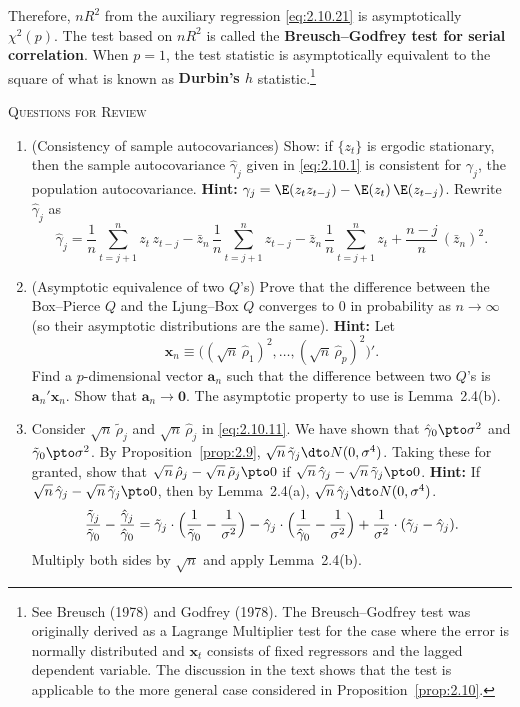 Therefore, $nR^2$ from the auxiliary regression \eqref{eq:2.10.21} is asymptotically
$\chi^2(p)$. The test based on $nR^2$ is called the
\textbf{Breusch--Godfrey test for serial correlation}. When $p = 1$, the test statistic is
asymptotically equivalent to the square of what is known as \textbf{Durbin's $h$}
statistic.\footnote{See Breusch (1978) and Godfrey (1978). The Breusch--Godfrey test
was originally derived as a Lagrange Multiplier test for the case where the error is
normally distributed and $\mathbf{x}_t$ consists of fixed regressors and the lagged dependent
variable. The discussion in the text shows that the test is applicable to the more general
case considered in Proposition~\ref{prop:2.10}.}

\bigskip
\noindent\textsc{Questions for Review}
\begin{enumerate}
\item (Consistency of sample autocovariances)\quad
Show: if $\{z_t\}$ is ergodic stationary,
then the sample autocovariance $\hat{\gamma}_j$ given in \eqref{eq:2.10.1} is consistent for
$\gamma_j$, the population autocovariance.
\textbf{Hint:} $\gamma_j = \E(z_t z_{t-j}) - \E(z_t)\,\E(z_{t-j})$. Rewrite $\hat{\gamma}_j$ as
\[
\hat{\gamma}_j = \frac{1}{n}\sum_{t=j+1}^{n} z_t\,z_{t-j}
- \bar{z}_n\,\frac{1}{n}\sum_{t=j+1}^{n}z_{t-j}
- \bar{z}_n\,\frac{1}{n}\sum_{t=j+1}^{n}z_t
+ \frac{n-j}{n}\,(\bar{z}_n)^2.
\]

\item (Asymptotic equivalence of two $Q$'s)\quad
Prove that the difference between the
Box--Pierce $Q$ and the Ljung--Box $Q$ converges to 0 in probability as $n \to \infty$
(so their asymptotic distributions are the same). \textbf{Hint:} Let
\[
\mathbf{x}_n \equiv \bigl((\sqrt{n}\,\hat{\rho}_1)^2, \ldots,
(\sqrt{n}\,\hat{\rho}_p)^2\bigr)'.
\]
Find a $p$-dimensional vector $\mathbf{a}_n$ such that the difference between two $Q$'s is
$\mathbf{a}_n'\mathbf{x}_n$. Show that $\mathbf{a}_n \to \mathbf{0}$. The asymptotic property to use is Lemma~2.4(b).

\item Consider $\sqrt{n}\,\tilde{\rho}_j$ and $\sqrt{n}\,\hat{\rho}_j$ in \eqref{eq:2.10.11}.
We have shown that $\hat{\gamma}_0 \pto \sigma^2$ and
$\tilde{\gamma}_0 \pto \sigma^2$. By Proposition~\ref{prop:2.9},
$\sqrt{n}\,\tilde{\gamma}_j \dto N(0, \sigma^4)$. Taking these for granted,
show that $\sqrt{n}\,\hat{\rho}_j - \sqrt{n}\,\tilde{\rho}_j \pto 0$
if $\sqrt{n}\,\hat{\gamma}_j - \sqrt{n}\,\tilde{\gamma}_j \pto 0$.
\textbf{Hint:} If $\sqrt{n}\,\hat{\gamma}_j - \sqrt{n}\,\tilde{\gamma}_j \pto 0$,
then by Lemma~2.4(a), $\sqrt{n}\,\hat{\gamma}_j \dto N(0, \sigma^4)$.
\[
\frac{\tilde{\gamma}_j}{\tilde{\gamma}_0}
- \frac{\hat{\gamma}_j}{\hat{\gamma}_0}
= \tilde{\gamma}_j \cdot \Bigl(\frac{1}{\tilde{\gamma}_0}
- \frac{1}{\sigma^2}\Bigr)
- \hat{\gamma}_j \cdot \Bigl(\frac{1}{\hat{\gamma}_0}
- \frac{1}{\sigma^2}\Bigr)
+ \frac{1}{\sigma^2}\cdot(\tilde{\gamma}_j - \hat{\gamma}_j).
\]
Multiply both sides by $\sqrt{n}$ and apply Lemma~2.4(b).
\end{enumerate}

